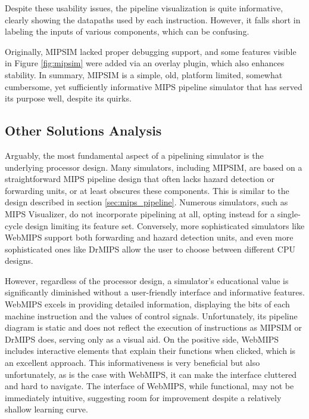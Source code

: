 Despite these usability issues, the pipeline visualization is quite informative, clearly showing the datapaths used by each instruction. However, it falls short in labeling the inputs of various components, which can be confusing. 

Originally, MIPSIM lacked proper debugging support, and some features visible in Figure \ref{fig:mipsim} were added via an overlay plugin, which also enhances stability. In summary, MIPSIM is a simple, old, platform limited, somewhat cumbersome, yet sufficiently informative MIPS pipeline simulator that has served its purpose well, despite its quirks.


\subsection{Other Solutions Analysis}\label{sec:other_solutions_analysis}

Arguably, the most fundamental aspect of a pipelining simulator is the underlying processor design. Many simulators, including MIPSIM, are based on a straightforward MIPS pipeline design that often lacks hazard detection or forwarding units, or at least obscures these components. This is similar to the design described in section \ref{sec:mips_pipeline}. Numerous simulators, such as MIPS Visualizer, do not incorporate pipelining at all, opting instead for a single-cycle design limiting its feature set. Conversely, more sophisticated simulators like WebMIPS support both forwarding and hazard detection units, and even more sophisticated ones like DrMIPS allow the user to choose between different CPU designs.

However, regardless of the processor design, a simulator's educational value is significantly diminished without a user-friendly interface and informative features. WebMIPS excels in providing detailed information, displaying the bits of each machine instruction and the values of control signals. Unfortunately, its pipeline diagram is static and does not reflect the execution of instructions as MIPSIM or DrMIPS does, serving only as a visual aid. On the positive side, WebMIPS includes interactive elements that explain their functions when clicked, which is an excellent approach. This informativeness is very beneficial but also unfortunately, as is the case with WebMIPS, it can make the interface cluttered and hard to navigate. The interface of WebMIPS, while functional, may not be immediately intuitive, suggesting room for improvement despite a relatively shallow learning curve. 

